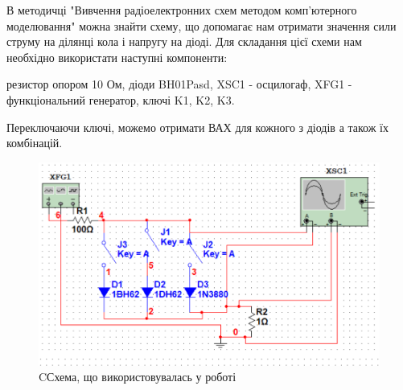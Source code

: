 \qquad	 В методичці "Вивчення радіоелектронних схем методом комп'ютерного моделювання" можна знайти схему, що допомагає нам отримати значення сили струму на ділянці кола і напругу на діоді. Для складання цієї схеми нам необхідно використати наступні компоненти: \par
\indent \hspace{1em} резистор опором 10 Ом, \newline
\indent \hspace{1em} діоди BH01Pasd, \newline
\indent \hspace{1em} XSC1 - осцилогаф,\newline
\indent \hspace{1em} XFG1 - функціональний генератор,\newline
\indent \hspace{1em} ключі K1, K2, K3.\par
Переключаючи ключі, можемо отримати ВАХ для кожного з діодів а також їх комбінацій.
\begin{figure}[ht]

\centering

\includegraphics[width=0.8\linewidth]{Схема.png}

\caption{CСхема, що використовувалась у роботі}

\label{fig:mpr}

\end{figure}
